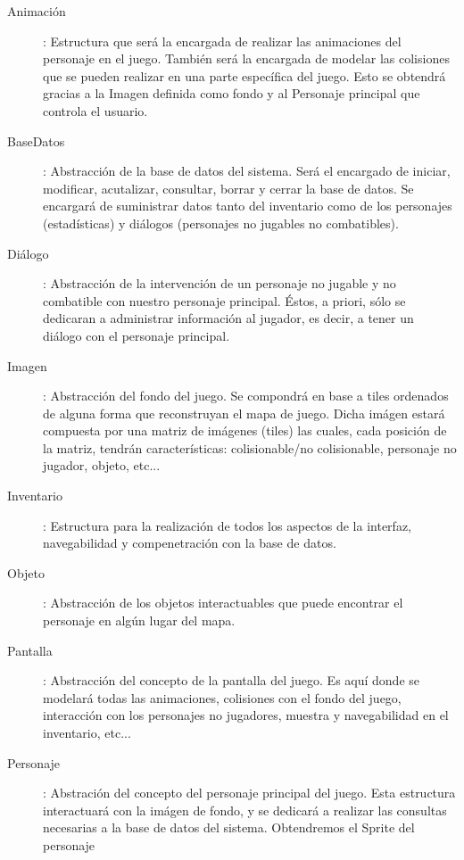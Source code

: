\documentclass[a4paper,10pt]{article}
\begin{document}
\begin{description}

\item [Animación]: Estructura que será la encargada de realizar las animaciones
  del personaje en el juego. También será la encargada de modelar las colisiones
  que se pueden realizar en una parte específica del juego. 
  Esto se obtendrá gracias a la Imagen definida como fondo y al Personaje
  principal que controla el usuario.

\item [BaseDatos]: Abstracción de la base de datos del sistema. Será el
  encargado de iniciar, modificar, acutalizar, consultar, borrar y cerrar la
  base de datos. Se encargará de suministrar datos tanto del inventario como de
  los personajes (estadísticas) y diálogos (personajes no jugables no combatibles).

\item [Diálogo]: Abstracción de la intervención de un personaje no jugable y no
  combatible con nuestro personaje principal. Éstos, a priori, sólo se dedicaran
  a administrar información al jugador, es decir, a tener un diálogo con el
  personaje principal.

\item [Imagen]: Abstracción del fondo del juego. Se compondrá en base a tiles
  ordenados de alguna forma que reconstruyan el mapa de juego. Dicha imágen
  estará compuesta por una matriz de imágenes (tiles) las cuales, cada posición
  de la matriz, tendrán características: colisionable/no colisionable, personaje
  no jugador, objeto, etc...

\item [Inventario]: Estructura para la realización de todos los aspectos de la
  interfaz, navegabilidad y compenetración con la base de datos.

\item [Objeto]: Abstracción de los objetos interactuables que puede encontrar el
  personaje en algún lugar del mapa. 

\item [Pantalla]: Abstracción del concepto de la pantalla del juego. Es aquí
  donde se modelará todas las animaciones, colisiones con el fondo del juego,
  interacción con los personajes no jugadores, muestra y navegabilidad en el
  inventario, etc...

\item [Personaje]: Abstración del concepto del personaje principal del
  juego. Esta estructura interactuará con la imágen de fondo, y se dedicará a
  realizar las consultas necesarias a la base de datos del sistema. Obtendremos
  el Sprite del personaje 


\end{description}
\end{document}
